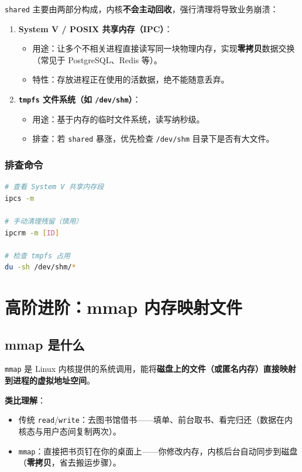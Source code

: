 \texttt{shared} 主要由两部分构成，内核\textbf{不会主动回收}，强行清理将导致业务崩溃：

\begin{enumerate}[leftmargin=2cm]
	\item \textbf{System V / POSIX 共享内存（IPC）}：
	\begin{itemize}
		\item 用途：让多个不相关进程直接读写同一块物理内存，实现\textbf{零拷贝}数据交换（常见于 PostgreSQL、Redis 等）。
		\item 特性：存放进程正在使用的活数据，绝不能随意丢弃。
	\end{itemize}
	\item \textbf{\texttt{tmpfs} 文件系统（如 \texttt{/dev/shm}）}：
	\begin{itemize}
		\item 用途：基于内存的临时文件系统，读写纳秒级。
		\item 排查：若 \texttt{shared} 暴涨，优先检查 \texttt{/dev/shm} 目录下是否有大文件。
	\end{itemize}
\end{enumerate}

\subsection*{排查命令}

\begin{lstlisting}[language=bash]
# 查看 System V 共享内存段
ipcs -m

# 手动清理残留（慎用）
ipcrm -m [ID]

# 检查 tmpfs 占用
du -sh /dev/shm/*
\end{lstlisting}


\chapter{高阶进阶：mmap 内存映射文件}

\section{mmap 是什么}

\texttt{mmap} 是 Linux 内核提供的系统调用，能将\textbf{磁盘上的文件（或匿名内存）直接映射到进程的虚拟地址空间}。

\textbf{类比理解}：
\begin{itemize}[leftmargin=2cm]
	\item 传统 \texttt{read}/\texttt{write}：去图书馆借书——填单、前台取书、看完归还（数据在内核态与用户态间复制两次）。
	\item \texttt{mmap}：直接把书页钉在你的桌面上——你修改内存，内核后台自动同步到磁盘（\textbf{零拷贝}，省去搬运步骤）。
\end{itemize}


